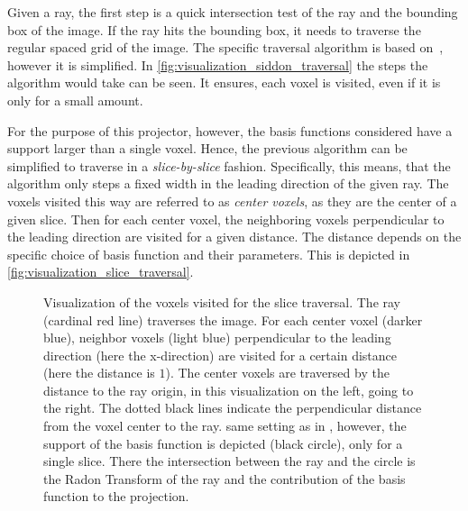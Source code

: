 Given a ray, the first step is a quick intersection test of the ray and the bounding box of the
image. If the ray hits the bounding box, it needs to traverse the regular spaced grid of the image.
The specific traversal algorithm is based on~\cite{amanatides_fast_1987}, however it is simplified.
In \autoref{fig:visualization_siddon_traversal} the steps the algorithm would take can be seen. It
ensures, each voxel is visited, even if it is only for a small amount.

For the purpose of this projector, however, the basis functions considered have a support larger
than a single voxel. Hence, the previous algorithm can be simplified to traverse in a
\textit{slice-by-slice} fashion. Specifically, this means, that the algorithm only steps a fixed
width in the leading direction of the given ray. The voxels visited this way are referred to as
\textit{center voxels}, as they are the center of a given slice. Then for each center voxel, the
neighboring voxels perpendicular to the leading direction are visited for a given distance. The
distance depends on the specific choice of basis function and their parameters. This is depicted in
\autoref{fig:visualization_slice_traversal}.

\begin{figure}[h]
	\centering
	\caption{ Visualization of the voxels visited
		for the slice traversal. The ray (cardinal red line) traverses the image. For each
		center voxel (darker blue), neighbor voxels (light blue) perpendicular to the
		leading direction (here the x-direction) are visited for a certain distance (here
		the distance is \(1\)). The center voxels are traversed by the distance to the ray
		origin, in this visualization on the left, going to the right. The dotted black
		lines indicate the perpendicular distance from the voxel center to the ray.
		 same setting as in
		, however, the support of the basis function is
		depicted (black circle), only for a single slice. There the intersection between the
		ray and the circle is the Radon Transform of the ray and the contribution of the
		basis function to the projection.
	}\label{fig:visualization_slice_traversal}
\end{figure}

